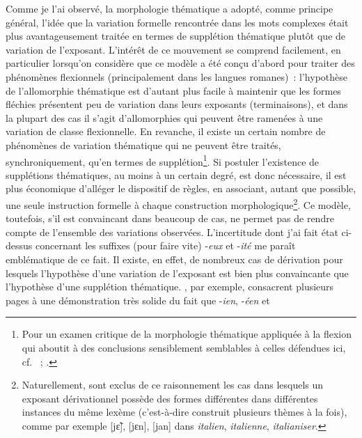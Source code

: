 \documentclass[output=paper]{langsci/langscibook}
\begin{document}
Comme je l'ai observé, la morphologie thématique a adopté, comme
principe général, l'idée que la variation formelle rencontrée dans les
mots complexes était plus avantageusement traitée en termes de
supplétion thématique plutôt que de variation de l'exposant. L'intérêt
de ce mouvement se comprend facilement, en particulier lorsqu'on
considère que ce modèle a été conçu d'abord pour traiter des phénomènes
flexionnels (principalement dans les langues romanes)~: l'hypothèse de
l'allomorphie thématique est d'autant plus facile à maintenir que les
formes fléchies présentent peu de variation dans leurs exposants
(terminaisons), et dans la plupart des cas il s'agit d'allomorphies qui
peuvent être ramenées à une variation de classe flexionnelle. En
revanche, il existe un certain nombre de phénomènes de variation
thématique qui ne peuvent être traités, synchroniquement, qu'en termes
de supplétion\footnote{Pour un examen critique de la morphologie
  thématique appliquée à la flexion qui aboutit à des conclusions
  sensiblement semblables à celles défendues ici, cf. %
\citet[34-84]{Bonami2014}%
%
~; %
\citet[18-22]{BonamiBoye2014}%
%
.}. Si postuler l'existence de
supplétions thématiques, au moins à un certain degré, est donc
nécessaire, il est plus économique d'alléger le dispositif de règles, en
associant, autant que possible, une seule instruction formelle à chaque
construction morphologique\footnote{Naturellement, sont exclus de ce
  raisonnement les cas dans lesquels un exposant dérivationnel possède
  des formes différentes dans différentes instances du même lexème
  (c'est-à-dire construit plusieurs thèmes à la fois), comme par exemple
  {[}jɛ̃{]}, {[}jɛn{]}, {[}jan{]} dans \emph{italien}, \emph{italienne},
  \emph{italianiser}.}. Ce modèle, toutefois, s'il est convaincant dans
beaucoup de cas, ne permet pas de rendre compte de l'ensemble des
variations observées. L'incertitude dont j'ai fait état ci-dessus
concernant les suffixes (pour faire vite) -\emph{eux} et -\emph{ité} me
paraît emblématique de ce fait. Il existe, en effet, de nombreux cas de
dérivation pour lesquels l'hypothèse d'une variation de l'exposant est
bien plus convaincante que l'hypothèse d'une supplétion thématique.
%
\citet{LignonStephanie2011}%
%
, par exemple, consacrent plusieurs pages à une
démonstration très solide du fait que -\emph{ien}, -\emph{éen} et
\end{document}

